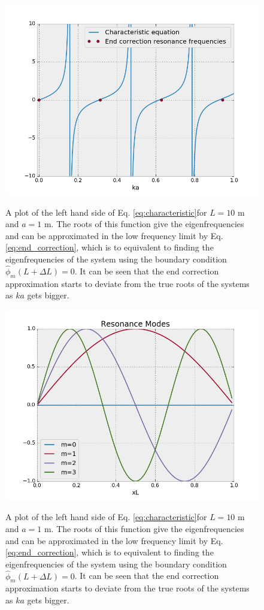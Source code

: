 \documentclass[12pt, letter]{report}
\begin{document}
\begin{figure}
\centering
\includegraphics[width=\linewidth]{resonance_freqs.png}
\label{fig:end_correction}
\caption{A plot of the left hand side of Eq. \ref{eq:characteristic}for $L=10$ m and $a=1$ m. The roots of this function give the eigenfrequencies and can be approximated in the low frequency limit by Eq. \ref{eq:end_correction}, which is to equivalent to finding the eigenfrequencies of the system using the boundary condition $\hat{\phi}_m(L + \Delta L) = 0$. It can be seen that the end correction approximation starts to deviate from the true roots of the systems as $ka$ gets bigger. }
\end{figure}
\begin{figure}
\centering
\includegraphics[width=\linewidth]{resonance_modes.png}
\label{fig:resonance_modes}
\caption{A plot of the left hand side of Eq. \ref{eq:characteristic}for $L=10$ m and $a=1$ m. The roots of this function give the eigenfrequencies and can be approximated in the low frequency limit by Eq. \ref{eq:end_correction}, which is to equivalent to finding the eigenfrequencies of the system using the boundary condition $\hat{\phi}_m(L + \Delta L) = 0$. It can be seen that the end correction approximation starts to deviate from the true roots of the systems as $ka$ gets bigger. }
\end{figure}
\end{document}
